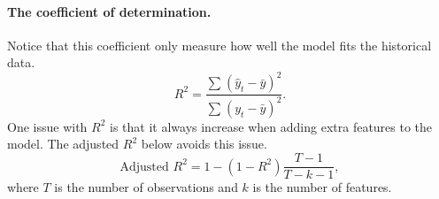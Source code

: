 \paragraph{The coefficient of determination.}
    Notice that this coefficient only measure how well the model fits the historical data. 
    \begin{equation}
        R^2 = \frac{\sum_{}^{}{(\hat{y}_t - \bar{y})^2 }}{\sum_{}^{}{(y_t - \bar{y})^2}}.
    \end{equation}
    One issue with $R^2$ is that it always increase when adding extra features to the model. The adjusted $R^2$ below avoids this issue.
    \begin{equation}
        \text{Adjusted $R^2$} = 1 - (1 - R^2)\frac{T-1}{T-k-1},
    \end{equation}
    where $T$ is the number of observations and $k$ is the number of features. 
    

